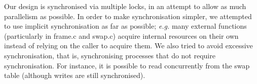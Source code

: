 Our design is synchronised via multiple locks, in an attempt to allow as much parallelism as possible.
In order to make synchronisation simpler, we attempted to use implicit synchronisation as far as possible; \textit{e.g.} many external functions (particularly in frame.c and swap.c) acquire internal resources on their own instead of relying on the caller to acquire them.
We also tried to avoid excessive synchronisation, that is, synchronising processes that do not require synchronisation. For instance, it is possible to read concurrently from the swap table (although writes are still synchronised).
